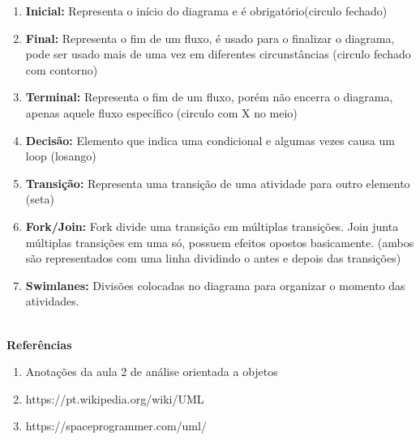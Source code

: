 \documentclass[12pt, a4paper]{article}
\begin{document}
\begin{enumerate}[label=\textbf{\arabic*}.]

    \item \textbf{Inicial:} Representa o início do diagrama e é obrigatório(circulo fechado)
    \item \textbf{Final:} Representa o fim de um fluxo, é usado para o finalizar o diagrama, 
    pode ser usado mais de uma vez em diferentes circunstâncias
    (circulo fechado com contorno)
    \item \textbf{Terminal:} Representa o fim de um fluxo, porém não encerra o diagrama,
    apenas aquele fluxo específico (circulo com X no meio)
    \item \textbf{Decisão:} Elemento que indica uma condicional e algumas vezes causa um loop
    (losango)
    \item \textbf{Transição:} Representa uma transição de uma atividade para outro elemento
    (seta)
    \item \textbf{Fork/Join:} Fork divide uma transição em múltiplas transições. Join junta
    múltiplas transições em uma só, possuem efeitos opostos basicamente. (ambos são representados com uma linha dividindo o antes e depois das transições)
    \item \textbf{Swimlanes:} Divisões colocadas no diagrama para organizar o momento
    das atividades. 

\end{enumerate}

\indent
\textbf{\\Referências}

\begin{enumerate}[label=\textbf{\arabic*}.]
    
    \item Anotações da aula 2 de análise orientada a objetos
    \item https://pt.wikipedia.org/wiki/UML
    \item https://spaceprogrammer.com/uml/

\end{enumerate}
\end{document}
